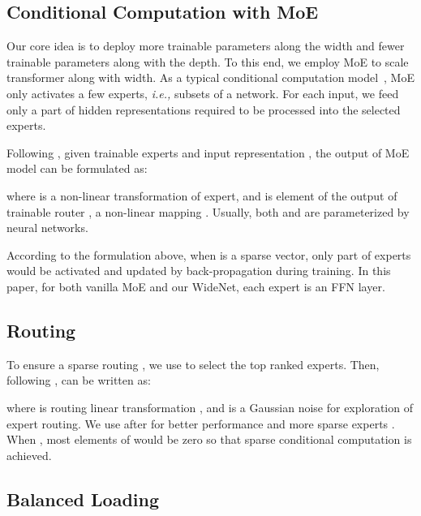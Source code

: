 \documentclass[letterpaper]{article} \usepackage{aaai22}  \usepackage{times}  \usepackage{helvet}  \usepackage{courier}  \usepackage[hyphens]{url}  \usepackage{graphicx} \urlstyle{rm} \def\UrlFont{\rm}  \usepackage{natbib}  \usepackage{caption} \DeclareCaptionStyle{ruled}{labelfont=normalfont,labelsep=colon,strut=off} \frenchspacing  \setlength{\pdfpagewidth}{8.5in}  \setlength{\pdfpageheight}{11in}  \usepackage{algorithm}
\newcommand{\ie}{\emph{i.e.,}\xspace}
\begin{document}
\subsection{Conditional Computation with MoE}



Our core idea is to deploy more trainable parameters along the width and fewer trainable parameters along with the depth. To this end, we employ MoE to scale transformer along with width. As a typical conditional computation model~\citep{bengio2013deep}, MoE only activates a few experts, \ie subsets of a network. For each input, we feed only a part of hidden representations required to be processed into the selected experts. 



Following \citet{shazeer2017outrageously}, given  trainable experts and input representation , the output of MoE model can be formulated as:


where  is a non-linear transformation  of  expert, and  is  element of the output of trainable router , a non-linear mapping . Usually, both  and  are parameterized by neural networks. 

According to the formulation above, when  is a sparse vector, only part of experts would be activated and updated by back-propagation during training. In this paper, for both vanilla MoE and our WideNet, each expert is an FFN layer.






\subsection{Routing}


To ensure a sparse routing , we use  to select the top ranked experts. Then, following \citet{riquelme2021scaling},  can be written as:


where  is routing linear transformation , and  is a Gaussian noise for exploration of expert routing. We use  after  for better performance and more sparse experts \citep{riquelme2021scaling,fedus2021switch}. When , most elements of  would be zero so that sparse conditional computation is achieved. 



\subsection{Balanced Loading}
\end{document}
